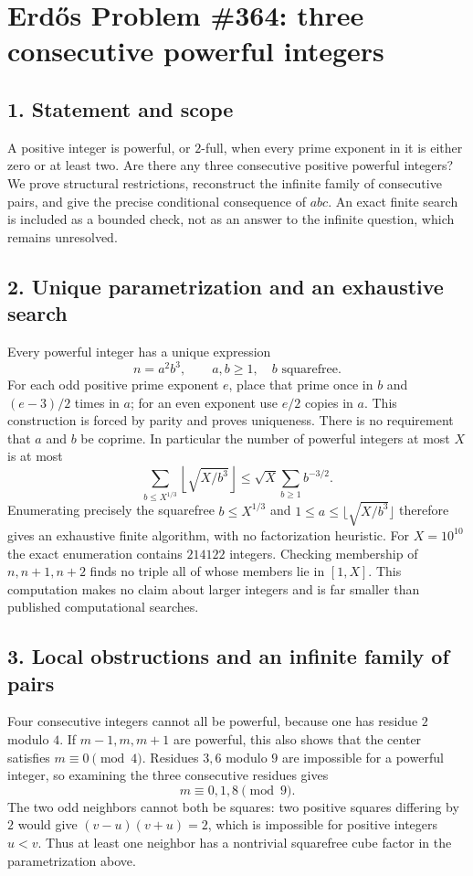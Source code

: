 \section*{Erd\H{o}s Problem \#364: three consecutive powerful integers}
\subsection*{1. Statement and scope}
A positive integer is powerful, or $2$-full, when every prime exponent
in it is either zero or at least two. Are there any three consecutive
positive powerful integers? We prove structural restrictions,
reconstruct the infinite family of consecutive pairs, and give the
precise conditional consequence of $abc$. An exact finite search is
included as a bounded check, not as an answer to the infinite question,
which remains unresolved.

\subsection*{2. Unique parametrization and an exhaustive search}
Every powerful integer has a unique expression
\[
 n=a^2b^3,\qquad a,b\ge1,\quad b\text{ squarefree}.
\]
For each odd positive prime exponent $e$, place that prime once in
$b$ and $(e-3)/2$ times in $a$; for an even exponent use $e/2$ copies
in $a$. This construction is forced by parity and proves uniqueness.
There is no requirement that $a$ and $b$ be coprime.
In particular the number of powerful integers at most $X$ is at most
\[
 \sum_{b\le X^{1/3}}\left\lfloor\sqrt{X/b^3}\right\rfloor
 \le \sqrt X\sum_{b\ge1}b^{-3/2}.
\]
Enumerating precisely the squarefree $b\le X^{1/3}$ and
$1\le a\le\lfloor\sqrt{X/b^3}\rfloor$ therefore gives an exhaustive
finite algorithm, with no factorization heuristic.
For $X=10^{10}$ the exact enumeration contains $214122$ integers.
Checking membership of $n,n+1,n+2$ finds no triple all of whose
members lie in $[1,X]$. This computation makes no claim about larger
integers and is far smaller than published computational searches.

\subsection*{3. Local obstructions and an infinite family of pairs}
Four consecutive integers cannot all be powerful, because one has
residue $2$ modulo $4$. If $m-1,m,m+1$ are powerful, this also shows
that the center satisfies $m\equiv0\pmod4$.
Residues $3,6$ modulo $9$ are impossible for a powerful integer,
so examining the three consecutive residues gives
\[
 m\equiv0,1,8\pmod9.
\]
The two odd neighbors cannot both be squares: two positive squares
differing by $2$ would give $(v-u)(v+u)=2$, which is impossible for
positive integers $u<v$. Thus at least one neighbor has a nontrivial
squarefree cube factor in the parametrization above.


